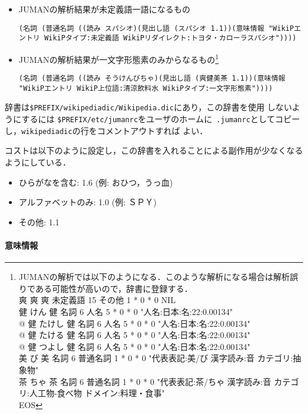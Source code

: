 \documentclass[a4j,titlepage]{jarticle}
\begin{document}
\begin{itemize}
 \item JUMANの解析結果が未定義語一語になるもの
\begin{verbatim}
(名詞 (普通名詞 ((読み スパシオ)(見出し語 (スパシオ 1.1))(意味情報 "WikiPエントリ WikiPタイプ:未定義語 WikiPリダイレクト:トヨタ・カローラスパシオ"))))
\end{verbatim}
 \item JUMANの解析結果が一文字形態素のみからなるもの\footnote{JUMANの解析では以下のようになる．このような解析になる場合は解析誤りである可能性が高いので，辞書に登録する．\\
爽 爽 爽 未定義語 15 その他 1 * 0 * 0 NIL\\
健 けん 健 名詞 6 人名 5 * 0 * 0 "人名:日本:名:22:0.00134"\\
@ 健 たけし 健 名詞 6 人名 5 * 0 * 0 "人名:日本:名:22:0.00134"\\
@ 健 たける 健 名詞 6 人名 5 * 0 * 0 "人名:日本:名:22:0.00134"\\
@ 健 つよし 健 名詞 6 人名 5 * 0 * 0 "人名:日本:名:22:0.00134"\\
美 び 美 名詞 6 普通名詞 1 * 0 * 0 "代表表記:美/び 漢字読み:音 カテゴリ:抽象物"\\
茶 ちゃ 茶 名詞 6 普通名詞 1 * 0 * 0 "代表表記:茶/ちゃ 漢字読み:音 カテゴリ:人工物-食べ物 ドメイン:料理・食事"\\
EOS
}
\begin{verbatim}
(名詞 (普通名詞 ((読み そうけんびちゃ)(見出し語 (爽健美茶 1.1))(意味情報 "WikiPエントリ WikiP上位語:清涼飲料水 WikiPタイプ:一文字形態素"))))
\end{verbatim}
\end{itemize}

辞書は\texttt{\$PREFIX/wikipediadic/Wikipedia.dic}にあり，この辞書を使用
しないようにするには
\texttt{\$PREFIX/etc/jumanrc}をユーザのホームに{\tt
.jumanrc}としてコピーし，\texttt{wikipediadic}の行をコメントアウトすれば
よい．

コストは以下のように設定し，この辞書を入れることによる副作用が少なくなる
ようにしている．

\begin{itemize}
 \item ひらがなを含む: 1.6 (例: おひつ，うっ血)
 \item アルファベットのみ: 1.0 (例: ＳＰＹ)
 \item その他: 1.1
\end{itemize}

\paragraph{意味情報}
\end{document}
